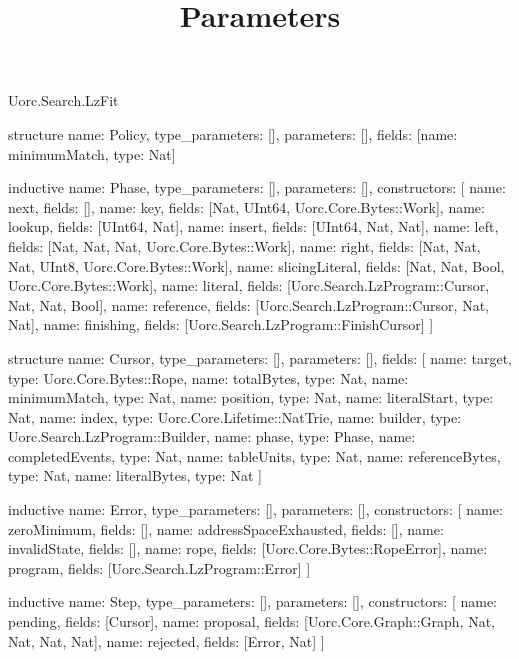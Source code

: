 \begin{lexlean}{Uorc.Search.LzFit}
\title{Parameters}
\begin{semanticmodule}
structure{
  name: Policy,
  type_parameters: [],
  parameters: [],
  fields: [{name: minimumMatch, type: Nat}]
}

inductive{
  name: Phase,
  type_parameters: [],
  parameters: [],
  constructors: [
    {name: next, fields: []},
    {name: key, fields: [Nat, UInt64, Uorc.Core.Bytes::Work]},
    {name: lookup, fields: [UInt64, Nat]},
    {name: insert, fields: [UInt64, Nat, Nat]},
    {name: left, fields: [Nat, Nat, Nat, Uorc.Core.Bytes::Work]},
    {name: right, fields: [Nat, Nat, Nat, UInt8, Uorc.Core.Bytes::Work]},
    {name: slicingLiteral, fields: [Nat, Nat, Bool, Uorc.Core.Bytes::Work]},
    {name: literal, fields: [Uorc.Search.LzProgram::Cursor, Nat, Nat, Bool]},
    {name: reference, fields: [Uorc.Search.LzProgram::Cursor, Nat, Nat]},
    {name: finishing, fields: [Uorc.Search.LzProgram::FinishCursor]}
  ]
}

structure{
  name: Cursor,
  type_parameters: [],
  parameters: [],
  fields: [
    {name: target, type: Uorc.Core.Bytes::Rope},
    {name: totalBytes, type: Nat},
    {name: minimumMatch, type: Nat},
    {name: position, type: Nat},
    {name: literalStart, type: Nat},
    {name: index, type: Uorc.Core.Lifetime::NatTrie},
    {name: builder, type: Uorc.Search.LzProgram::Builder},
    {name: phase, type: Phase},
    {name: completedEvents, type: Nat},
    {name: tableUnits, type: Nat},
    {name: referenceBytes, type: Nat},
    {name: literalBytes, type: Nat}
  ]
}

inductive{
  name: Error,
  type_parameters: [],
  parameters: [],
  constructors: [
    {name: zeroMinimum, fields: []},
    {name: addressSpaceExhausted, fields: []},
    {name: invalidState, fields: []},
    {name: rope, fields: [Uorc.Core.Bytes::RopeError]},
    {name: program, fields: [Uorc.Search.LzProgram::Error]}
  ]
}

inductive{
  name: Step,
  type_parameters: [],
  parameters: [],
  constructors: [
    {name: pending, fields: [Cursor]},
    {name: proposal, fields: [Uorc.Core.Graph::Graph, Nat, Nat, Nat, Nat]},
    {name: rejected, fields: [Error, Nat]}
  ]
}


\end{semanticmodule}
\end{lexlean}
